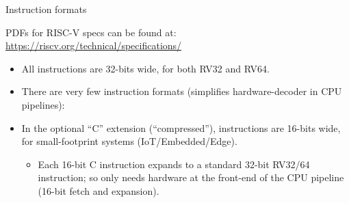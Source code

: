 \documentclass{article}
\newcommand{\hmmmm}{\hspace*{4em}}
\begin{document}
\begin{center}
{\Huge
  Instruction formats}

\vspace{1ex}

PDFs for RISC-V specs can be found at: \url{https://riscv.org/technical/specifications/}

\vspace{0.3in}

\begin{minipage}{10in}
  \begin{itemize}\LARGE
  \item All instructions are 32-bits wide, for both RV32 and RV64.

  \item  There are very few instruction formats (simplifies hardware-decoder in CPU pipelines):
  \end{itemize}

  \vspace{0.2in}

  \hmmmm {}

  \vspace{0.2in}

  \begin{itemize}\LARGE
  \item In the optional ``C'' extension (``compressed''), instructions
    are 16-bits wide, for small-footprint systems (IoT/Embedded/Edge).
    \begin{itemize}
    \item Each 16-bit C instruction expands to a standard 32-bit RV32/64
      instruction; so only needs hardware at the front-end of the CPU
      pipeline (16-bit fetch and expansion).
    \end{itemize}
  \end{itemize}
\end{minipage}

\end{center}

\clearpage
\end{document}

